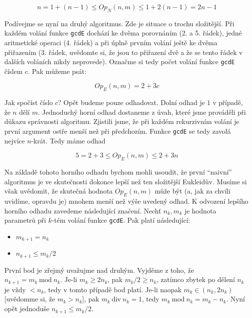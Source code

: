 \begin{displaymath}
 n = 1 + (n-1) \leq Op_N(n,m) \leq 1 + 2(n-1) = 2n - 1
\end{displaymath}


Podívejme se nyní na druhý algoritmus. Zde je situace o trochu složitější. Při každém volání funkce {\tt gcdE} dochází ke
dvěma porovnáním (2. a 5. řádek), jedné aritmetické operaci (4. řádek) a při úplně prvním volání ještě ke dvěma přiřazením
(3. řádek, uvědomte si, že jsou to přiřazení dvě a že se tento řádek v dalších
voláních nikdy neprovede). Označme si tedy počet volání funkce {\tt gcdE} číslem $c$. Pak můžeme psát:

\begin{displaymath}
Op_E(n,m) = 2 + 3c
\end{displaymath}

Jak spočíst číslo $c$? Opět budeme pouze odhadovat. Dolní odhad je $1$ v případě, že $n$ dělí $m$. Jednoduchý horní odhad dostaneme
z úvah, které jsme prováděli při důkazu správnosti algoritmu. Zjistili jsme, že při každém rekurzivním volání je první argument ostře
menší než při předchozím. Funkce {\tt gcdE} se tedy zavolá nejvíce $n$-krát. Tedy máme odhad

\begin{displaymath}
 5 = 2+3\leq Op_E(n,m) \leq 2 + 3n
\end{displaymath}

Na základě tohoto horního odhadu bychom mohli usoudit, že první ``naivní'' algoritmus je ve skutečnosti dokonce lepší než ten složitější
Eukleidův. Musíme si však uvědomit, že skutečná hodnota $Op_E(n,m)$ může být (a, jak za chvíli
uvidíme, opravdu je) mnohem menší než výše uvedený odhad. K odvození lepšího horního odhadu zavedeme následující značení. Nechť
$n_k,m_k$ je hodnota parametrů při $k$-tém volání funkce {\tt gcdE}. Pak platí následující:

\begin{itemize}
 \item $m_{k+1}=n_k$
 \item $n_{k+1}\leq m_k/2$
\end{itemize}

První bod je zřejmý uvažujme nad druhým. Vyjděme z toho, že $n_{k+1} = m_k\ \mbox{mod}\ n_k$. Je-li $m_k\geq{}2n_k$, pak $m_k/2\geq n_k$, zatímco
zbytek po dělení $n_k$ je vždy $< n_k$, tedy v tomto případě bod platí. Je-li naopak $m_k \in (n_k, 2n_k)$ [uvědomme si, že $m_k > n_k]$, pak
$m_k\ \mbox{div}\ n_k = 1$, tedy $m_k\ \mbox{mod}\ n_k = m_k-n_k$. Nyní opět jednoduše $n_{k+1} \leq{} m_k/2$.

